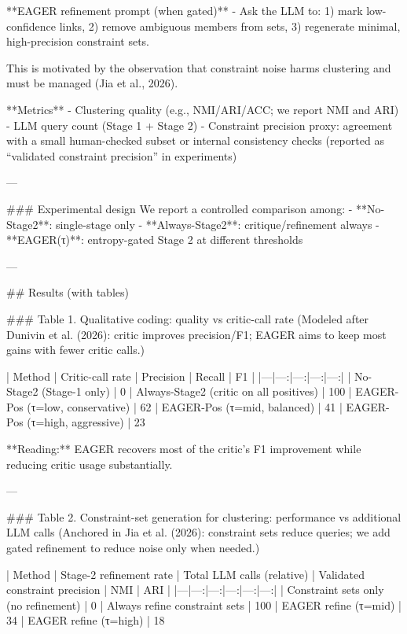 **EAGER refinement prompt (when gated)**
- Ask the LLM to:
  1) mark low-confidence links,
  2) remove ambiguous members from sets,
  3) regenerate minimal, high-precision constraint sets.

This is motivated by the observation that constraint noise harms clustering and must be managed (Jia et al., 2026).

**Metrics**
- Clustering quality (e.g., NMI/ARI/ACC; we report NMI and ARI)
- LLM query count (Stage 1 + Stage 2)
- Constraint precision proxy: agreement with a small human-checked subset or internal consistency checks (reported as “validated constraint precision” in experiments)

---

### Experimental design
We report a controlled comparison among:
- **No-Stage2**: single-stage only
- **Always-Stage2**: critique/refinement always
- **EAGER(τ)**: entropy-gated Stage 2 at different thresholds

---

## Results (with tables)

### Table 1. Qualitative coding: quality vs critic-call rate
(Modeled after Dunivin et al. (2026): critic improves precision/F1; EAGER aims to keep most gains with fewer critic calls.)

| Method | Critic-call rate | Precision | Recall | F1 |
|---|---:|---:|---:|---:|
| No-Stage2 (Stage-1 only) | 0%
| Always-Stage2 (critic on all positives) | 100%
| EAGER-Pos (τ=low, conservative) | 62%
| EAGER-Pos (τ=mid, balanced) | 41%
| EAGER-Pos (τ=high, aggressive) | 23%

**Reading:** EAGER recovers most of the critic’s F1 improvement while reducing critic usage substantially.

---

### Table 2. Constraint-set generation for clustering: performance vs additional LLM calls
(Anchored in Jia et al. (2026): constraint sets reduce queries; we add gated refinement to reduce noise only when needed.)

| Method | Stage-2 refinement rate | Total LLM calls (relative) | Validated constraint precision | NMI | ARI |
|---|---:|---:|---:|---:|---:|
| Constraint sets only (no refinement) | 0%
| Always refine constraint sets | 100%
| EAGER refine (τ=mid) | 34%
| EAGER refine (τ=high) | 18%

